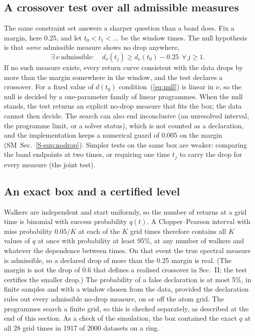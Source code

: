 \documentclass[aps,pre,twocolumn,superscriptaddress,nofootinbib,10pt]{revtex4-2}
\newcommand{\SM}{SM}
\begin{document}
\subsection{A crossover test over all admissible measures}\label{sec:nodrop}
The same constraint set answers a sharper question than a band does. Fix a margin, here 0.25, and let $t_0<t_1<\dots$ be the window times. The null hypothesis is that \emph{some} admissible measure shows no drop anywhere,
\begin{equation}
\exists\,\nu\ \text{admissible}:\quad d_\nu(t_j)\ge d_\nu(t_0)-0.25\ \ \forall\,j\ge1 .
\label{eq:null}
\end{equation}
If no such measure exists, every return curve consistent with the data drops by more than the margin somewhere in the window, and the test declares a crossover. For a fixed value of $d(t_0)$ condition~(\ref{eq:null}) is linear in $\nu$, so the null is decided by a one-parameter family of linear programmes. When the null stands, the test returns an explicit no-drop measure that fits the box; the data cannot then decide. The search can also end inconclusive (an unresolved interval, the programme limit, or a solver status), which is not counted as a declaration, and the implementation keeps a numerical guard of 0.005 on the margin (\SM\ Sec.~\ref{S-sup:nodrop}). Simpler tests on the same box are weaker: comparing the band endpoints at two times, or requiring one time $t_j$ to carry the drop for every measure (the joint test).

\subsection{An exact box and a certified level}\label{sec:cp}
Walkers are independent and start uniformly, so the number of returns at a grid time is binomial with success probability $q(t)$. A Clopper--Pearson interval with miss probability $0.05/K$ at each of the $K$ grid times therefore contains all $K$ values of $q$ at once with probability at least 95\%, at any number of walkers and whatever the dependence between times. On that event the true spectral measure is admissible, so a declared drop of more than the 0.25 margin is real. (The margin is not the drop of 0.6 that defines a realised crossover in Sec.~II; the test certifies the smaller drop.) The probability of a false declaration is at most 5\%, in finite samples and with a window chosen from the data, provided the declaration rules out every admissible no-drop measure, on or off the atom grid. The programmes search a finite grid, so this is checked separately, as described at the end of this section. As a check of the simulation, the box contained the exact $q$ at all 28 grid times in 1917 of 2000 datasets on a ring.
\end{document}
